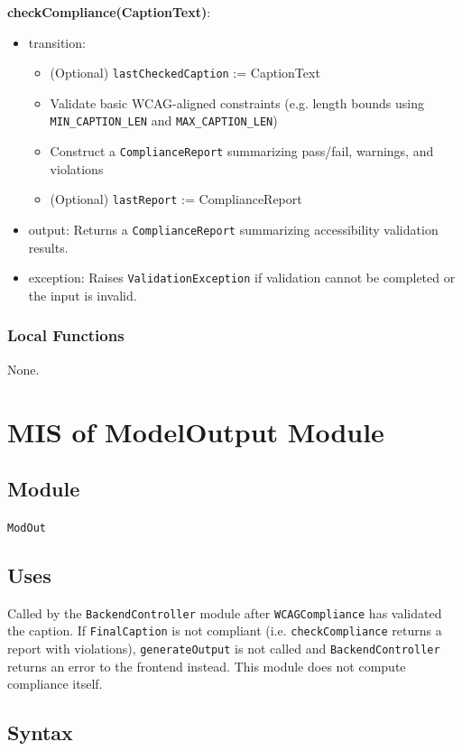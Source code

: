 \documentclass[12pt, titlepage]{article}
\begin{document}
\noindent \textbf{checkCompliance(CaptionText)}:
\begin{itemize}
  \item transition:
  \begin{itemize}
    \item (Optional) \texttt{lastCheckedCaption} := CaptionText
    \item Validate basic WCAG-aligned constraints (e.g. length bounds using \texttt{MIN\_CAPTION\_LEN} and \texttt{MAX\_CAPTION\_LEN})
    \item Construct a \texttt{ComplianceReport} summarizing pass/fail, warnings, and violations
    \item (Optional) \texttt{lastReport} := ComplianceReport
  \end{itemize}
  \item output: Returns a \texttt{ComplianceReport} summarizing accessibility validation results.
  \item exception: Raises \texttt{ValidationException} if validation cannot be completed or the input is invalid.
\end{itemize}

\subsubsection{Local Functions}
None.

\section{MIS of ModelOutput Module} \label{modout}

\subsection{Module}
\texttt{ModOut}

\subsection{Uses}Called by the \texttt{BackendController} module after \texttt{WCAGCompliance} has validated the caption. If \texttt{FinalCaption} is not compliant (i.e. \texttt{checkCompliance} returns a report with violations), \texttt{generateOutput} is not called and \texttt{BackendController} returns an error to the frontend instead. This module does not compute compliance itself.


\subsection{Syntax}
\end{document}
